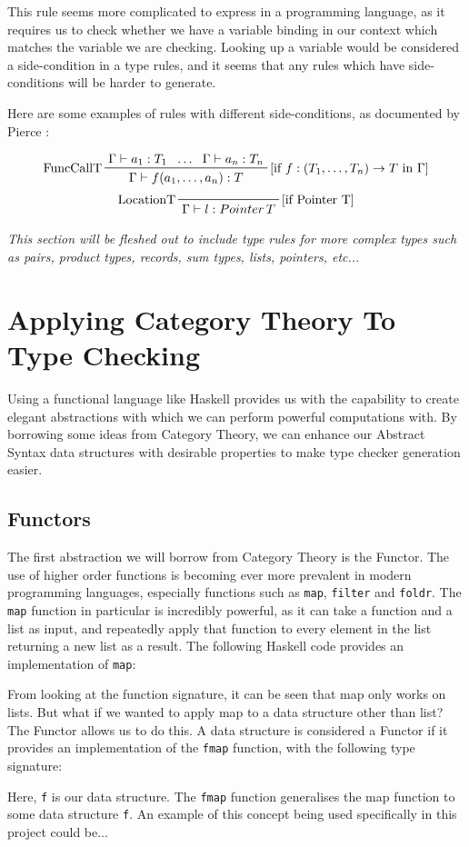\documentclass{UoYCSproject}
\begin{document}

This rule seems more complicated to express in a programming language, as it
requires us to check whether we have a variable binding in our context which
matches the variable we are checking. Looking up a variable would be considered
a side-condition in a type rules, and it seems that any rules which have
side-conditions will be harder to generate.

Here are some examples of rules with different side-conditions, as documented
by Pierce \cite{PierceTAPL}:

\begin{displaymath}
\prftree[l, r]{[if $f:(T_1, \dots, T_n) \rightarrow T$ in $\Gamma$]}{FuncCallT}{\Gamma \vdash a_1:T_1}{\dots}{\Gamma \vdash a_n:T_n}{\Gamma \vdash f(a_1, \dots, a_n):T}
\end{displaymath}
\begin{displaymath}
\prftree[l, r]{[if Pointer T]}{LocationT}{\Gamma \vdash l:Pointer \, T}
\end{displaymath}

\textit{This section will be fleshed out to include type rules for more complex
    types such as pairs, product types, records, sum types, lists,
    pointers, etc...}


\section{Applying Category Theory To Type Checking}
\label{sec:CategoryTheory}

Using a functional language like Haskell provides us with the capability to
create elegant abstractions with which we can perform powerful computations
with. By borrowing some ideas from Category Theory, we can enhance our Abstract
Syntax data structures with desirable properties to make type checker generation
easier.

\subsection{Functors}
The first abstraction we will borrow from Category Theory is the Functor. The
use of higher order functions is becoming ever more prevalent in modern
programming languages, especially functions such as \lstinline{map},
\lstinline{filter} and \lstinline{foldr}. The \lstinline{map} function in
particular is incredibly powerful, as it can take a function and a list as
input, and repeatedly apply that function to every element in the list returning
a new list as a result. The following Haskell code provides an implementation
of \lstinline{map}:

From looking at the function signature, it can be seen that map only works on
lists. But what if we wanted to apply map to a data structure other than list?
The Functor allows us to do this. A data structure is considered a Functor if
it provides an implementation of the \lstinline{fmap} function, with the
following type signature:

Here, \lstinline{f} is our data structure. The \lstinline{fmap} function
generalises the map function to some data structure \lstinline{f}. An example
of this concept being used specifically in this project could be...
\end{document}
